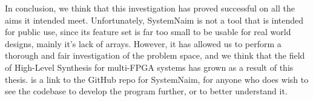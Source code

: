 In conclusion, we think that this investigation has proved successful on all the aims it intended meet. Unfortunately, SystemNaim is not a tool that is intended for public use, since its feature set is far too small to be usable for real world designs, mainly it's lack of arrays. However, it has allowed us to perform a thorough and fair investigation of the problem space, and we think that the field of High-Level Synthesis for multi-FPGA systems has grown as a result of this thesis. \cite{sysNaim-github} is a link to the GitHub repo for SystemNaim, for anyone who does wish to see the codebase to develop the program further, or to better understand it.